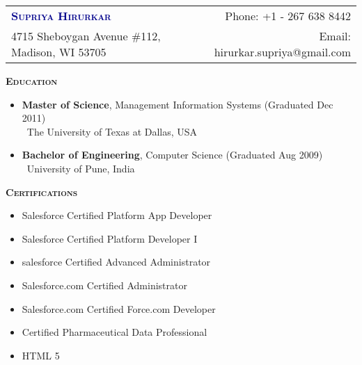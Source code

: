 \documentclass[11pt]{article}
\begin{document}
\begin{flushleft}
\begin{tabular*}{\textwidth}{@{\extracolsep{\fill}}lr}%
{\LARGE{\textcolor{darkblue}{\textbf{\textsc{Supriya Hirurkar}}}}} & Phone: +1 - 267 638 8442\\
4715 Sheboygan Avenue \#112, Madison, WI 53705 & Email: hirurkar.supriya@gmail.com
\end{tabular*}
\end{flushleft}
\begin{mdframed}[backgroundcolor=light-gray, linecolor=light-gray, roundcorner=10pt, shadow=false, shadowsize=1pt]
\Large{\textbf{\textsc{Education}}}
\end{mdframed}
\begin{itemize}\addtolength{\itemsep}{-0.5\baselineskip}%
\item{\textbf{Master of Science}, Management Information Systems \hfill (Graduated Dec 2011) }\\
	\textendash\ The University of Texas at Dallas, USA
\item{\textbf{Bachelor of Engineering}, Computer Science \hfill (Graduated Aug 2009) }\\
	\textendash\ University of Pune, India
\end{itemize}
\begin{mdframed}[backgroundcolor=light-gray, linecolor=light-gray, roundcorner=10pt, shadow=false, shadowsize=1pt]
\Large{\textbf{\textsc{Certifications}}}
\end{mdframed}
\begin{itemize}\addtolength{\itemsep}{-0.5\baselineskip}
	\item{Salesforce Certified Platform App Developer}
	\item{Salesforce Certified Platform Developer I}
	\item{salesforce Certified Advanced Administrator}	
	\item{Salesforce.com Certified Administrator}
	\item{Salesforce.com Certified Force.com Developer}
	\item{Certified Pharmaceutical Data Professional}
	\item{HTML 5}	
\end{itemize}
\end{document}
